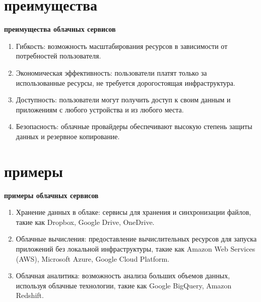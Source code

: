 \documentclass{beamer}
\begin{document}
    \section{преимущества}
    \begin{frame}
        \begin{center}
            \textbf{преимущества облачных сервисов}
        \end{center}
        \vspace{10}
        
        \begin{enumerate}
            \item Гибкость: возможность масштабирования ресурсов в зависимости от потребностей пользователя.
            \vspace{5}
            \item Экономическая эффективность: пользователи платят только за использованные ресурсы, не требуется дорогостоящая инфраструктура.
            \vspace{5}
            \item Доступность: пользователи могут получить доступ к своим данным и приложениям с любого устройства и из любого места.
            \vspace{5}
            \item Безопасность: облачные провайдеры обеспечивают высокую степень защиты данных и резервное копирование.
        \end{enumerate}
    \end{frame}
    
    
    
    \section{примеры}
    \begin{frame}
        \begin{center}
            \textbf{примеры облачных сервисов}
        \end{center}
        \vspace{10}
        
        \begin{enumerate}
            \item Хранение данных в облаке: сервисы для хранения и синхронизации файлов, такие как Dropbox, Google Drive, OneDrive.
            \vspace{5}
            \item Облачные вычисления: предоставление вычислительных ресурсов для запуска приложений без локальной инфраструктуры, такие как Amazon Web Services (AWS), Microsoft Azure, Google Cloud Platform.
            \vspace{5}
            \item Облачная аналитика: возможность анализа больших объемов данных, используя облачные технологии, такие как Google BigQuery, Amazon Redshift.
        \end{enumerate}
    \end{frame}
    
\end{document}
